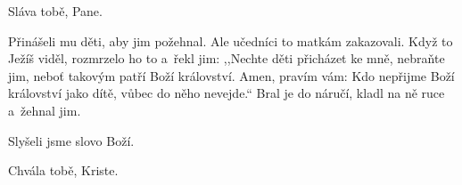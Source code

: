 \rubricatum{\Rbardot{}} Sláva tobě, Pane.

Přinášeli mu děti, aby jim požehnal. Ale učedníci to matkám zakazovali.
Když to Ježíš viděl, rozmrzelo ho to a~řekl jim:
,,Nechte děti přicházet ke mně, nebraňte jim, neboť takovým patří Boží království.
Amen, pravím vám: Kdo nepřijme Boží království jako dítě, vůbec do něho nevejde.``
Bral je do náručí, kladl na ně ruce a~žehnal jim.

Slyšeli jsme slovo Boží.

\rubricatum{\Rbardot{}} Chvála tobě, Kriste.
